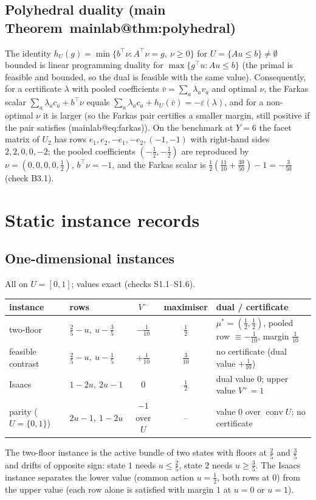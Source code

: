 \documentclass[11pt,a4paper]{article}
\makeatletter
\theoremstyle{plain}
\theoremstyle{definition}
\theoremstyle{remark}
\newcommand{\conv}{\operatorname{conv}}
\newcommand{\tfr}[2]{\tfrac{#1}{#2}}
\newcommand{\mref}[1]{\csname mainlab@#1\endcsname}
\newcommand{\meqref}[1]{(\mref{#1})}
\makeatother
\begin{document}
\subsection{Polyhedral duality (main Theorem~\mref{thm:polyhedral})}
The identity $h_U(g)=\min\{b^\top\nu:A^\top\nu=g,\ \nu\ge0\}$ for $U=\{Au\le b\}\neq\emptyset$ bounded is linear programming duality for $\max\{g^\top u:Au\le b\}$ (the primal is feasible and bounded, so the dual is feasible with the same value). Consequently, for a certificate $\lambda$ with pooled coefficients $\bar v=\sum_a\lambda_av_a$ and optimal $\nu$, the Farkas scalar $\sum_a\lambda_ac_a+b^\top\nu$ equals $\sum_a\lambda_ac_a+h_U(\bar v)=-\varepsilon(\lambda)$, and for a non-optimal $\nu$ it is larger (so the Farkas pair certifies a smaller margin, still positive if the pair satisfies \meqref{eq:farkas}). On the benchmark at $Y=6$ the facet matrix of $U_2$ has rows $e_1,e_2,-e_1,-e_2,(-1,-1)$ with right-hand sides $2,2,0,0,-2$; the pooled coefficients $(-\tfr12,-\tfr12)$ are reproduced by $\nu=(0,0,0,0,\tfr12)$, $b^\top\nu=-1$, and the Farkas scalar is $\tfr12(\tfr{11}{10}+\tfr{39}{50})-1=-\tfr3{50}$ (check B3.1).
\section{Static instance records}\label{si:static}

\subsection{One-dimensional instances}
All on $U=[0,1]$; values exact (checks S1.1--S1.6).
\begin{center}\footnotesize
\begin{tabularx}{\textwidth}{llcc>{\raggedright\arraybackslash}X}
\toprule
instance & rows & $V^-$ & maximiser & dual / certificate\\
\midrule
two-floor & $\tfr25-u,\ u-\tfr35$ & $-\tfr1{10}$ & $\tfr12$ & $\mu^\ast=(\tfr12,\tfr12)$, pooled row $\equiv-\tfr1{10}$, margin $\tfr1{10}$\\
feasible contrast & $\tfr25-u,\ u-\tfr15$ & $+\tfr1{10}$ & $\tfr3{10}$ & no certificate (dual value $+\tfr1{10}$)\\
Isaacs & $1-2u,\ 2u-1$ & $0$ & $\tfr12$ & dual value $0$; upper value $V^+=1$\\
parity ($U=\{0,1\}$) & $2u-1,\ 1-2u$ & $-1$ over $U$ & -- & value $0$ over $\conv U$; no certificate\\
\bottomrule
\end{tabularx}
\end{center}
The two-floor instance is the active bundle of two states with floors at $\tfr25$ and $\tfr35$ and drifts of opposite sign: state $1$ needs $u\le\tfr25$, state $2$ needs $u\ge\tfr35$. The Isaacs instance separates the lower value (common action $u=\tfr12$, both rows at $0$) from the upper value (each row alone is satisfied with margin $1$ at $u=0$ or $u=1$).
\end{document}
